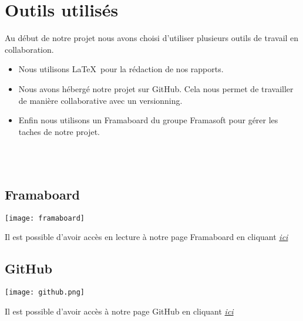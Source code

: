


\section{Outils utilisés}

Au début de notre projet nous avons choisi d'utiliser plusieurs outils de travail en collaboration.

\begin{itemize}
\item Nous utilisons \LaTeX~pour la rédaction de nos rapports.
\item Nous avons hébergé notre projet sur GitHub. Cela nous permet de travailler de manière collaborative avec un versionning.
\item Enfin nous utilisons un Framaboard du groupe Framasoft pour gérer les taches de notre projet.
\end{itemize}

~\\
~\\

\subsection{Framaboard}
\begin{center}
\texttt{[image: framaboard]}
\end{center}
Il est possible d'avoir accès en lecture à notre page Framaboard en cliquant  \textit{\href{https://smart.framaboard.org/?controller=board&action=readonly&token=ab1e20bb26472df067dc24cbd84d9b28eea71bfd68bdea07ab5a9b555ce0}{ici}}

\subsection{GitHub}
\begin{center}
\texttt{[image: github.png]}
\end{center}
Il est possible d'avoir accès à notre page GitHub en cliquant  \textit{\href{https://github.com/magichal/SMART}{ici}}






